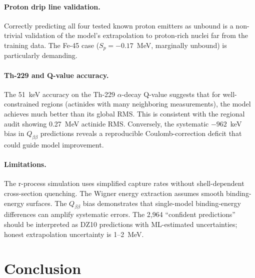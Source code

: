 \documentclass[twocolumn,letterpaper,10pt]{article}
\begin{document}
\paragraph{Proton drip line validation.}
Correctly predicting all four tested known proton emitters as unbound is a
non-trivial validation of the model's extrapolation to proton-rich nuclei
far from the training data. The Fe-45 case ($S_p = -0.17$~MeV, marginally
unbound) is particularly demanding.

\paragraph{Th-229 and Q-value accuracy.}
The 51~keV accuracy on the Th-229 $\alpha$-decay Q-value suggests that
for well-constrained regions (actinides with many neighboring measurements),
the model achieves much better than its global RMS. This is consistent with
the regional audit showing 0.27~MeV actinide RMS. Conversely, the
systematic $-962$~keV bias in $Q_{\beta\beta}$ predictions reveals a
reproducible Coulomb-correction deficit that could guide model improvement.

\paragraph{Limitations.}
The r-process simulation uses simplified capture rates without
shell-dependent cross-section quenching. The Wigner energy extraction
assumes smooth binding-energy surfaces. The $Q_{\beta\beta}$ bias
demonstrates that single-model binding-energy differences can amplify
systematic errors. The 2,964 ``confident predictions'' should be
interpreted as DZ10 predictions with ML-estimated uncertainties; honest
extrapolation uncertainty is 1--2~MeV.

\section{Conclusion}
\end{document}
